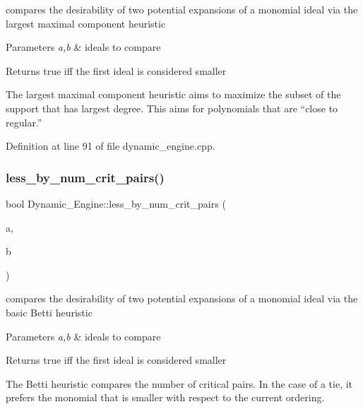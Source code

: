 compares the desirability of two potential expansions of a monomial ideal via the largest maximal component heuristic 


\begin{DoxyParams}{Parameters}
{\em a,b} & ideals to compare \\
\hline
\end{DoxyParams}
\begin{DoxyReturn}{Returns}
{\ttfamily true} iff the first ideal is considered smaller
\end{DoxyReturn}
The largest maximal component heuristic aims to maximize the subset of the support that has largest degree. This aims for polynomials that are ``close to regular.'' 

Definition at line 91 of file dynamic\+\_\+engine.\+cpp.

\mbox{\label{namespace_dynamic___engine_ab4b77c648c1c2892cffba4dcf2a6d80a}} 
\subsubsection{\texorpdfstring{less\+\_\+by\+\_\+num\+\_\+crit\+\_\+pairs()}{less\_by\_num\_crit\_pairs()}}
{\footnotesize\ttfamily bool Dynamic\+\_\+\+Engine\+::less\+\_\+by\+\_\+num\+\_\+crit\+\_\+pairs (\begin{DoxyParamCaption}\item[{\hyperlink{group___g_b_computation_class_dynamic___engine_1_1_p_p___with___ideal}{P\+P\+\_\+\+With\+\_\+\+Ideal} \&}]{a,  }\item[{\hyperlink{group___g_b_computation_class_dynamic___engine_1_1_p_p___with___ideal}{P\+P\+\_\+\+With\+\_\+\+Ideal} \&}]{b }\end{DoxyParamCaption})}



compares the desirability of two potential expansions of a monomial ideal via the basic Betti heuristic 


\begin{DoxyParams}{Parameters}
{\em a,b} & ideals to compare \\
\hline
\end{DoxyParams}
\begin{DoxyReturn}{Returns}
{\ttfamily true} iff the first ideal is considered smaller
\end{DoxyReturn}
The Betti heuristic compares the number of critical pairs. In the case of a tie, it prefers the monomial that is smaller with respect to the current ordering. 

